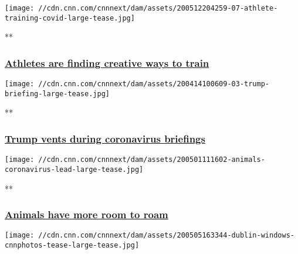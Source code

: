 \href{/2020/05/14/world/gallery/athletes-train-during-lockdown/index.html}{}

\texttt{[image: //cdn.cnn.com/cnnnext/dam/assets/200512204259-07-athlete-training-covid-large-tease.jpg]}

**

\hypertarget{athletes-are-finding-creative-ways-to-train}{%
\subsubsection{\texorpdfstring{\href{/2020/05/14/world/gallery/athletes-train-during-lockdown/index.html}{Athletes
are finding creative ways to
train}}{Athletes are finding creative ways to train}}\label{athletes-are-finding-creative-ways-to-train}}

\href{/2020/04/08/politics/gallery/trump-white-house-coronavirus-briefings/index.html}{}

\texttt{[image: //cdn.cnn.com/cnnnext/dam/assets/200414100609-03-trump-briefing-large-tease.jpg]}

**

\hypertarget{trump-vents-during-coronavirus-briefings}{%
\subsubsection{\texorpdfstring{\href{/2020/04/08/politics/gallery/trump-white-house-coronavirus-briefings/index.html}{Trump
vents during coronavirus
briefings}}{Trump vents during coronavirus briefings}}\label{trump-vents-during-coronavirus-briefings}}

\href{/2020/05/01/world/gallery/animals-coronavirus-trnd/index.html}{}

\texttt{[image: //cdn.cnn.com/cnnnext/dam/assets/200501111602-animals-coronavirus-lead-large-tease.jpg]}

**

\hypertarget{animals-have-more-room-to-roam}{%
\subsubsection{\texorpdfstring{\href{/2020/05/01/world/gallery/animals-coronavirus-trnd/index.html}{Animals
have more room to
roam}}{Animals have more room to roam}}\label{animals-have-more-room-to-roam}}

\href{/2020/05/05/europe/gallery/dublin-home-portraits-coronavirus/index.html}{}

\texttt{[image: //cdn.cnn.com/cnnnext/dam/assets/200505163344-dublin-windows-cnnphotos-tease-large-tease.jpg]}

